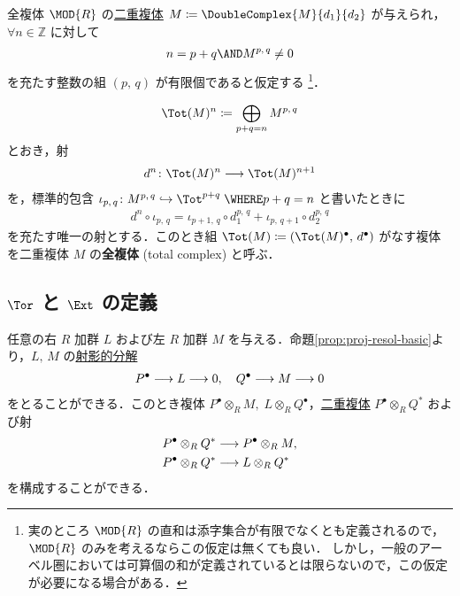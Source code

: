 \documentclass[algtopo_main]{subfiles}
\begin{document}
\begin{mydef}[label=def:Tot]{全複体}
    $\MOD{R}$ の\hyperref[def:double-complex]{二重複体} $M \coloneqq \DoubleComplex{M}{d_1}{d_2}$ が与えられ，$\forall n \in \mathbb{Z}$ に対して
    \begin{align}
        n = p+q \AND M^{p,\, q} \neq 0
    \end{align}
    を充たす整数の組 $(p,\, q)$ が有限個であると仮定する
    \footnote{実のところ $\MOD{R}$ の直和は添字集合が有限でなくとも定義されるので，$\MOD{R}$ のみを考えるならこの仮定は無くても良い．
        しかし，一般のアーベル圏においては可算個の和が定義されているとは限らないので，この仮定が必要になる場合がある．
    }．

    \tcblower

    \begin{align}
        \Tot(M)^n \coloneqq \bigoplus_{p+q = n} M^{p,\, q}
    \end{align}
    とおき，射
    \begin{align}
        d^n \colon \Tot(M)^n \lto \Tot(M)^{n+1}
    \end{align}
    を，標準的包含 $\iota_{p,\, q} \colon M^{p,\, q} \hookrightarrow \Tot^{p+q}\; \WHERE p+q = n$ と書いたときに
    \begin{align}
        d^n \circ \iota_{p,\, q} = \iota_{p+1,\, q} \circ d_1^{p,\, q} + \iota_{p,\, q+1} \circ d_2^{p,\, q}
    \end{align}
    を充たす唯一の射とする．このとき組 $\Tot(M) \coloneqq (\Tot(M)^\bullet,\, d^\bullet)$ がなす複体を二重複体 $M$ の\textbf{全複体} (total complex) と呼ぶ．
\end{mydef}

\subsection{$\Tor$ と $\Ext$ の定義}

任意の右 $R$ 加群 $L$ および左 $R$ 加群 $M$ を与える．命題\ref{prop:proj-resol-basic}より，$L,\, M$ の\hyperref[def:projective-resolution]{射影的分解}
\begin{align}
    P^\bullet \longrightarrow L \longrightarrow 0,\quad Q^\bullet \longrightarrow M \longrightarrow 0
\end{align}
をとることができる．このとき複体 $P^\bullet \otimes_R M,\; L \otimes_R Q^\bullet$，\hyperref[def:double-complex]{二重複体} $P^\bullet \otimes_R Q^*$ および射
\begin{align}
    &P^\bullet \otimes_R Q^* \longrightarrow P^\bullet \otimes_R M,\label{morphism-1} \\
    &P^\bullet \otimes_R Q^* \longrightarrow L \otimes_R Q^* \label{morphism-2}
\end{align}
を構成することができる．
\end{document}
